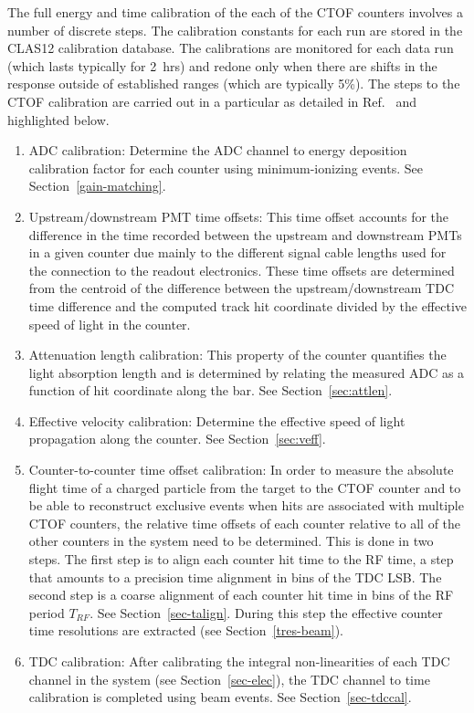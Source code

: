 \documentclass{elsart}
\begin{document}
The full energy and time calibration of the each of the CTOF counters involves a number of discrete
steps. The calibration constants for each run are stored in the CLAS12 calibration database. The
calibrations are monitored for each data run (which lasts typically for 2~hrs) and redone only when
there are shifts in the response outside of established ranges (which are typically 5\%). The steps
to the CTOF calibration are carried out in a particular as detailed in Ref.~\cite{ctof-calib} and
highlighted below.

\begin{enumerate}
\item ADC calibration: Determine the ADC channel to energy deposition calibration factor for each
counter using minimum-ionizing events. See Section~\ref{gain-matching}.

\item Upstream/downstream PMT time offsets: This time offset accounts for the difference in the time
recorded between the upstream and downstream PMTs in a given counter due mainly to the different
signal cable lengths used for the connection to the readout electronics. These time offsets are determined
from the centroid of the difference between the upstream/downstream TDC time difference and the
computed track hit coordinate divided by the effective speed of light in the counter. 

\item Attenuation length calibration: This property of the counter quantifies the light absorption length
and is determined by relating the measured ADC as a function of hit coordinate along the bar. See
Section~\ref{sec:attlen}.

\item Effective velocity calibration: Determine the effective speed of light propagation along the
counter. See Section~\ref{sec:veff}.

\item Counter-to-counter time offset calibration: In order to measure the absolute flight time of a
charged particle from the target to the CTOF counter and to be able to reconstruct exclusive events
when hits are associated with multiple CTOF counters, the relative time offsets of each counter relative
to all of the other counters in the system need to be determined. This is done in two steps. The first
step is to align each counter hit time to the RF time, a step that amounts to a precision time alignment in
bins of the TDC LSB. The second step is a coarse alignment of each counter hit time in bins of the RF
period $T_{RF}$. See Section~\ref{sec-talign}. During this step the effective counter time resolutions
are extracted (see Section~\ref{tres-beam}).

\item TDC calibration: After calibrating the integral non-linearities of each TDC channel in the system
(see Section~\ref{sec-elec}), the TDC channel to time calibration is completed using beam events. See
Section~\ref{sec-tdccal}.

\end{enumerate}
\end{document}
